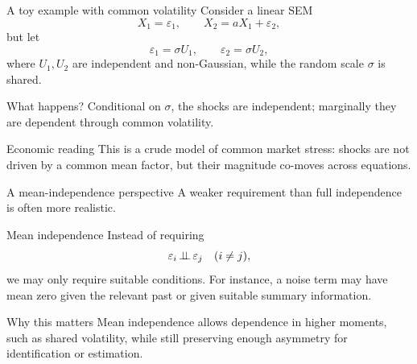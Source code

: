 \documentclass[dvipsnames,aspectratio=169,handout]{beamer}
\begin{document}
\begin{frame}{A toy example with common volatility}
Consider a linear SEM
\[
X_1 = \varepsilon_1,
\qquad
X_2 = aX_1 + \varepsilon_2,
\]
but let
\[
\varepsilon_1 = \sigma U_1,
\qquad
\varepsilon_2 = \sigma U_2,
\]
where $U_1,U_2$ are independent and non-Gaussian, while the random scale $\sigma$ is shared.

\begin{alertblock}{What happens?}
Conditional on $\sigma$, the shocks are independent; marginally they are dependent through common volatility.
\end{alertblock}

\begin{block}{Economic reading}
This is a crude model of common market stress: shocks are not driven by a common mean factor, but their magnitude co-moves across equations.
\end{block}
\end{frame}

\begin{frame}{A mean-independence perspective}
A weaker requirement than full independence is often more realistic.

\begin{block}{Mean independence}
Instead of requiring
\[
\varepsilon_i \mbox{\,$\perp\!\!\!\perp$\,} \varepsilon_j \quad (i\neq j),
\]
we may only require suitable  conditions.
For instance, a noise term may have mean zero given the relevant past or given suitable summary information.
\end{block}

\begin{alertblock}{Why this matters}
Mean independence allows dependence in higher moments, such as shared volatility, while still preserving enough asymmetry for identification or estimation.
\end{alertblock}
\end{frame}
\end{document}
